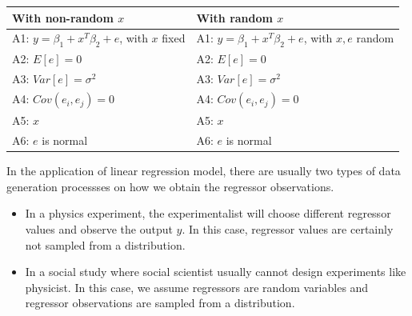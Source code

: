 \begin{refsection}
\begin{table}[H]
	\begin{tabular}{|l|l|}
		\hline
		With non-random $x$                              & With random $x$                                      \\ \hline
		A1: $y = \beta_1 + x^T\beta_2+e$, with $x$ fixed & A1: $y = \beta_1 + x^T\beta_2+e$, with $x, e$ random \\ \hline
		A2: $E[e] = 0$                                   & A2: $E[e] = 0$                                       \\ \hline
		A3: $Var[e] = \sigma^2$                          & A3: $Var[e] = \sigma^2$                              \\ \hline
		A4: $Cov(e_i, e_j) = 0$                          & A4: $Cov(e_i, e_j) = 0$                              \\ \hline
		A5: $x$                                          & A5: $x$                                              \\ \hline
		A6: $e$ is normal                                & A6: $e$ is normal                                    \\ \hline
	\end{tabular}
\end{table}

\begin{remark}\cite[25]{greene2017econometric}
In the application of linear regression model, there are usually two types of data generation processses on how we obtain the regressor observations.	
\begin{itemize}
	\item In a physics experiment, the experimentalist will choose different regressor values and observe the output $y$. In this case, regressor values are certainly not sampled from a distribution.
	\item In a social study where social scientist usually cannot design experiments like physicist. In this case, we assume regressors are random variables and regressor observations are sampled from a distribution.  
\end{itemize}
\end{remark}



\end{refsection}

